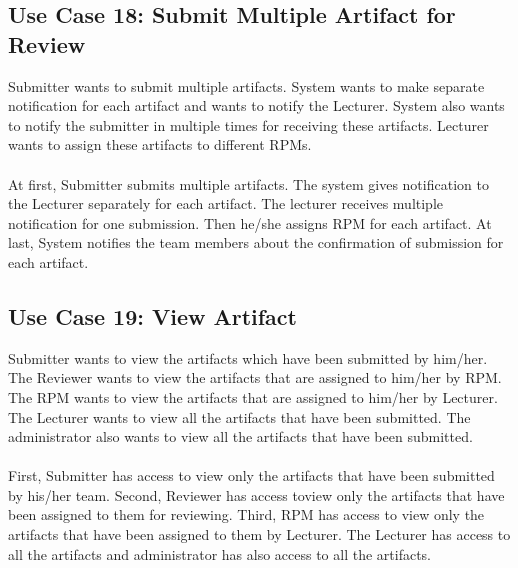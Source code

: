     
    
    
    \subsection*{Use Case 18: Submit Multiple Artifact for Review }
    Submitter  wants  to  submit  multiple  artifacts.  System  wants  to  make  separate  notification  for each  artifact  and  wants  to  notify the Lecturer.  System  also  wants  to  notify  the  submitter  in multiple times for receiving these artifacts. Lecturer wants to assign these artifacts to different RPMs. 
    \\
    \\
    At  first,  Submitter  submits  multiple  artifacts.  The  system  gives  notification  to the Lecturer separately for each artifact. The lecturer receives multiple notification for one submission. Then he/she  assigns  RPM  for  each  artifact.  At  last,  System  notifies  the  team  members  about  the confirmation of submission for each artifact.
    
    
    
    
    \subsection*{Use Case 19: View Artifact }
    Submitter wants  to  view  the  artifacts  which  have  been  submitted  by  him/her.  The  Reviewer wants  to  view  the  artifacts  that  are  assigned  to  him/her  by  RPM.  The  RPM  wants  to  view  the artifacts that are assigned to him/her by Lecturer. The Lecturer wants to view all the artifacts that have  been  submitted.  The  administrator  also  wants  to  view  all  the  artifacts  that  have  been submitted.
    \\
    \\
    First, Submitter has access to view only the artifacts that have been submitted by his/her team. Second,  Reviewer  has  access  toview  only  the  artifacts  that  have  been  assigned  to  them  for reviewing. Third, RPM has access to view only the artifacts that have been assigned to them by Lecturer. The Lecturer has access to all the artifacts and administrator has also access to all the artifacts.
    
    
    
    
    
    
    
    
